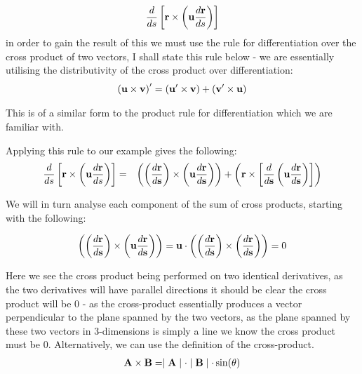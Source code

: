\documentclass{mm2}
\begin{document}
\bigskip
\begin{answer}{3}
\begin{eqnarray}
\frac{d}{ds} \left[ {\bf r} \times \left({\bf u} \frac{d{\bf r}}{ds} \right) \right]
\end{eqnarray}
in order to gain the result of this we must use the rule for differentiation over the cross product of two vectors, I shall state this rule below - we are essentially utilising the distributivity of the cross product over differentiation:
\begin{eqnarray}
\left( {\bf u} \times {\bf v} \right)' = \left({\bf u'} \times {\bf v}\right) + \left( {\bf v'} \times {\bf u}\right)
\end{eqnarray}

This is of a similar form to the product rule for differentiation which we are familiar with.

Applying this rule to our example gives the following:
\begin{eqnarray}
\frac{d}{ds} \left[ {\bf r} \times \left({\bf u} \frac{d{\bf r}}{ds} \right) \right] &=& \left( \left(\frac{d{\bf r}}{d {\bf s}} \right) \times \left({\bf u} \frac{d{\bf r}}{d {\bf s}}\right)\right) + \left( {\bf r} \times \left[\frac{d}{d{\bf s}}\left({\bf u}\frac{d {\bf r}}{d {\bf s}} \right) \right]  \right)
\end{eqnarray}

We will in turn analyse each component of the sum of cross products, starting with the following:

\begin{eqnarray}
 \left( \left(\frac{d{\bf r}}{d {\bf s}} \right) \times \left({\bf u} \frac{d{\bf r}}{d {\bf s}}\right)\right) =  {\bf u} \cdot \left( \left(\frac{d{\bf r}}{d {\bf s}} \right) \times \left( \frac{d{\bf r}}{d {\bf s}}\right)\right) = 0
\end{eqnarray}

Here we see the cross product being performed on two identical derivatives, as the two derivatives will have parallel directions it should be clear the cross product will be 0 - as the cross-product essentially produces a vector perpendicular to the plane spanned by the two vectors, as the plane spanned by these two vectors in 3-dimensions is simply a line we know the cross product must be 0. Alternatively, we can use the definition of the cross-product.
 \begin{eqnarray}
 {\bf A}\times {\bf B} = \mid {\bf A}\mid  \cdot \mid {\bf B}\mid  \cdot \sin(\theta)
 \end{eqnarray}
 

\end{answer}
\end{document}
